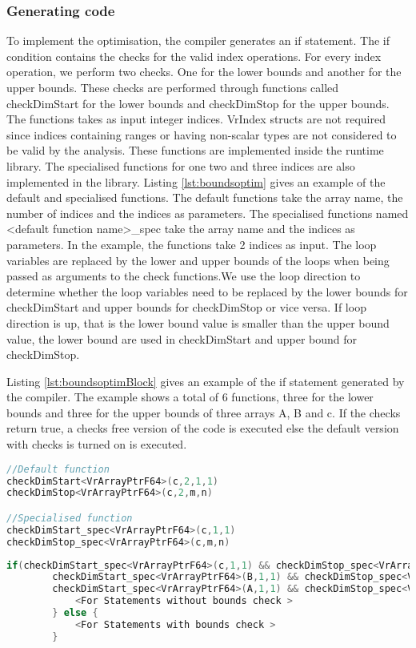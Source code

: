 \subsubsection{Generating code}
To implement the optimisation, the compiler generates an if statement. The if condition contains the checks for the valid index operations. For every index operation, we perform two checks. One for the lower bounds and another for the upper bounds. These checks are performed through functions called checkDimStart for the lower bounds and checkDimStop for the upper bounds. The functions takes as input integer indices. VrIndex structs are not required since indices containing ranges or having non-scalar types are not considered to be valid by the analysis. These functions are implemented inside the runtime library. The specialised functions for one two and three indices are also implemented in the library. Listing \ref{lst:boundsoptim} gives an example of the default and specialised functions. The default functions take the array name, the number of indices and the indices as parameters. The specialised functions named <default function name>\_spec take the array name and the indices as parameters. In the example, the functions take 2 indices as input. The loop variables are replaced by the lower and upper bounds of the loops when being passed as arguments to the check functions.We use the loop direction to determine whether the loop variables need to be replaced by the lower bounds for checkDimStart and upper bounds for checkDimStop or vice versa. If loop direction is up, that is the lower bound value is smaller than the upper bound value, the lower bound are used in checkDimStart and upper bound for checkDimStop. 

Listing \ref{lst:boundsoptimBlock} gives an example of the if statement generated by the compiler. The example shows a total of 6 functions, three for the lower bounds and three for the upper bounds of three arrays A, B and c. If the checks return true, a checks free version of the code is executed else the default version with checks is turned on is executed. 
\begin{lstlisting}[float,language=c,caption={An example of the default and specialised function calls for the boundscheck optimisations},label={lst:boundsoptim}]
//Default function
checkDimStart<VrArrayPtrF64>(c,2,1,1)
checkDimStop<VrArrayPtrF64>(c,2,m,n)

//Specialised function
checkDimStart_spec<VrArrayPtrF64>(c,1,1)
checkDimStop_spec<VrArrayPtrF64>(c,m,n)
\end{lstlisting}
\begin{lstlisting}[float,language=c,caption={An example of the if statement generated for the boundscheck optimisations},label={lst:boundsoptimBlock}]
 if(checkDimStart_spec<VrArrayPtrF64>(c,1,1) && checkDimStop_spec<VrArrayPtrF64>(c,m,n) && 
		checkDimStart_spec<VrArrayPtrF64>(B,1,1) && checkDimStop_spec<VrArrayPtrF64>(B,k,n) && 
		checkDimStart_spec<VrArrayPtrF64>(A,1,1) && checkDimStop_spec<VrArrayPtrF64>(A,m,k)) {
			<For Statements without bounds check >	
		} else {
			<For Statements with bounds check >	
		}
	
\end{lstlisting}

